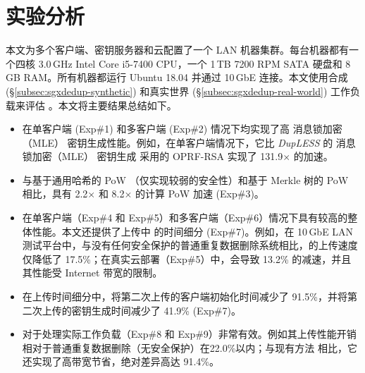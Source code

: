 \section{实验分析}
\label{sec:sgxdedup-evaluation}

本文为多个客户端、密钥服务器和云配置了一个 LAN 机器集群。每台机器都有一个四核 3.0\,GHz Intel Core i5-7400 CPU，一个 1\,TB 7200 RPM SATA 硬盘和 8\,GB RAM。所有机器都运行 Ubuntu 18.04 并通过 10\,GbE 连接。本文使用合成 (\S\ref{subsec:sgxdedup-synthetic}) 和真实世界 (\S\ref{subsec:sgxdedup-real-world}) 工作负载来评估 \sysnameS。本文将主要结果总结如下。

\begin{itemize}[leftmargin=*]
\item \sysnameS 在单客户端 (Exp\#1) 和多客户端 (Exp\#2) 情况下均实现了高 消息锁加密（MLE） 密钥生成性能。例如，在单客户端情况下，它比 {\em DupLESS} 的 消息锁加密（MLE） 密钥生成 \cite{bellare2013DupLESS} 采用的 OPRF-RSA 实现了 131.9$\times$ 的加速。
\item \sysnameS 与基于通用哈希的 PoW \cite{xu2013weak}（仅实现较弱的安全性）和基于 Merkle 树的 PoW \cite{halevi11} 相比，具有 2.2$\times$ 和 8.2$\times$ 的计算 PoW 加速 (Exp\#3)。
\item \sysnameS 在单客户端（Exp\#4 和 Exp\#5）和多客户端（Exp\#6）情况下具有较高的整体性能。本文还提供了上传中 \sysnameS 的时间细分 (Exp\#7)。例如，在 10\,GbE LAN 测试平台中，与没有任何安全保护的普通重复数据删除系统相比，\sysnameS 的上传速度仅降低了 17.5\%；在真实云部署（Exp\#5）中，\sysnameS 会导致 13.2\% 的减速，并且其性能受 Internet 带宽的限制。
\item 在上传时间细分中，\sysnameS 将第二次上传的客户端初始化时间减少了 91.5\%，并将第二次上传的密钥生成时间减少了 41.9\% (Exp\#7)。
\item \sysnameS 对于处理实际工作负载（Exp\#8 和 Exp\#9）非常有效。例如其上传性能开销相对于普通重复数据删除（无安全保护）在22.0\%以内；与现有方法 \cite{li15,harnik2010side} 相比，它还实现了高带宽节省，绝对差异高达 91.4\%。
\end{itemize}


